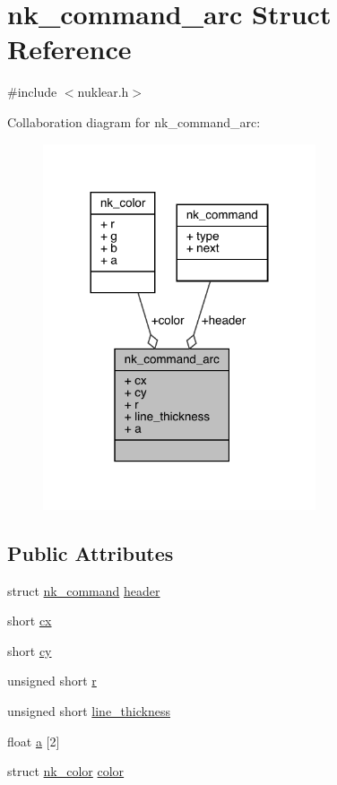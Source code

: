 \hypertarget{structnk__command__arc}{}\section{nk\+\_\+command\+\_\+arc Struct Reference}
\label{structnk__command__arc}


{\ttfamily \#include $<$nuklear.\+h$>$}



Collaboration diagram for nk\+\_\+command\+\_\+arc\+:
\nopagebreak
\begin{figure}[H]
\begin{center}
\leavevmode
\includegraphics[width=228pt]{structnk__command__arc__coll__graph}
\end{center}
\end{figure}
\subsection*{Public Attributes}
\begin{DoxyCompactItemize}
\item 
struct \mbox{\hyperlink{structnk__command}{nk\+\_\+command}} \mbox{\hyperlink{structnk__command__arc_a0aa359ae78961f4c9b4ff5f004e7df61}{header}}
\item 
short \mbox{\hyperlink{structnk__command__arc_ac348e962a2508e0c537b6dd5c8363b01}{cx}}
\item 
short \mbox{\hyperlink{structnk__command__arc_ac4a837a3aa6f5e59dc872d7ef0a37cde}{cy}}
\item 
unsigned short \mbox{\hyperlink{structnk__command__arc_a46c4562ff5abdf1c75bc95ba86f9f9ba}{r}}
\item 
unsigned short \mbox{\hyperlink{structnk__command__arc_a6ba6c78fea7429e1ec08d4f1f6e5cf99}{line\+\_\+thickness}}
\item 
float \mbox{\hyperlink{structnk__command__arc_a446403034fc3de885fe610d9fdd7c7bb}{a}} \mbox{[}2\mbox{]}
\item 
struct \mbox{\hyperlink{structnk__color}{nk\+\_\+color}} \mbox{\hyperlink{structnk__command__arc_ab74d0d447665a04b87b656eb300a5884}{color}}
\end{DoxyCompactItemize}


